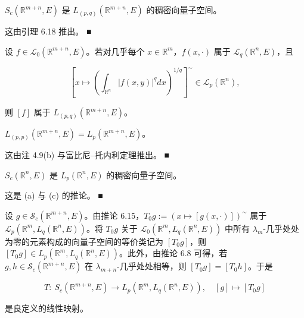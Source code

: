 \begin{remark}

\begin{items}
\item

$ S_{c}(\mathbb{R}^{m+n},E) $ 是 $ L_{(p,q)}(\mathbb{R}^{m+n},E) $ 的稠密向量子空间。

\proofhead
这由引理 6.18 推出。 \nobreak\hspace{0.35em}■
\item

设 $ f \in \mathcal{L}_{0}(\mathbb{R}^{m+n},E) $。若对几乎每个 $ x \in \mathbb{R}^{m} $，$ f(x,\cdot) $ 属于 $ \mathcal{L}_{q}(\mathbb{R}^{n},E) $，且

\[
\left[x \mapsto \left(\int_{\mathbb{R}^{n}}|f(x,y)|^{q}dx\right)^{1/q}\right]^{\sim} \in \mathcal{L}_{p}(\mathbb{R}^{n}) ,
\]

则 $ [f] $ 属于 $ L_{(p,q)}(\mathbb{R}^{m+n},E) $。

\item

$ L_{(p,p)}(\mathbb{R}^{m+n},E) = L_{p}(\mathbb{R}^{m+n},E) $。

\proofhead
这由注 4.9(b) 与富比尼–托内利定理推出。 \nobreak\hspace{0.35em}■
\item

$ S_{c}(\mathbb{R}^{n},E) $ 是 $ L_{p}(\mathbb{R}^{n},E) $ 的稠密向量子空间。

\proofhead
这是 (a) 与 (c) 的推论。 \nobreak\hspace{0.35em}■
\end{items}

设 $ g \in \mathcal{S}_{c}(\mathbb{R}^{m+n},E) $。由推论 6.15，$ T_{0}g := (x \mapsto [g(x,\cdot)])^{\sim} $ 属于 $ \mathcal{L}_{p}\left(\mathbb{R}^{m},L_{q}(\mathbb{R}^{n},E)\right) $。将 $ T_{0}g $ 关于 $ \mathcal{L}_{0}(\mathbb{R}^{m},L_{q}(\mathbb{R}^{n},E)) $ 中所有 $ \lambda_{m} $-几乎处处为零的元素构成的向量子空间的等价类记为 $ [T_{0}g] $，则 $ [T_{0}g] \in L_{p}\left(\mathbb{R}^{m},L_{q}(\mathbb{R}^{n},E)\right) $。此外，由推论 6.8 可得，若 $ g,h \in \mathcal{S}_{c}(\mathbb{R}^{m+n},E) $ 在 $ \lambda_{m+n} $-几乎处处相等，则 $ [T_{0}g] = [T_{0}h] $。于是

\[
T:\ S_{c}(\mathbb{R}^{m+n},E) \to L_{p}\left(\mathbb{R}^{m},L_{q}(\mathbb{R}^{n},E)\right) ,\quad [g] \mapsto [T_{0}g]
\]

是良定义的线性映射。

\end{remark}

